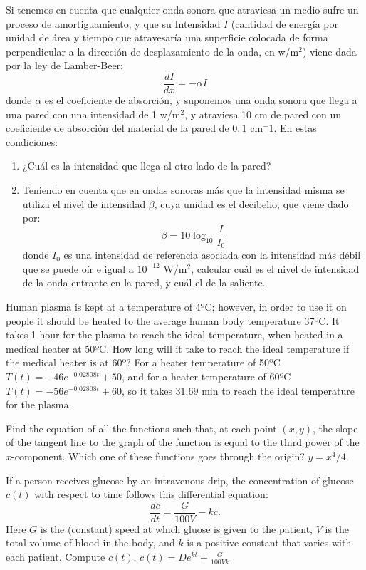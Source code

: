 {Si tenemos en cuenta que cualquier onda sonora que atraviesa un medio sufre un proceso de amortiguamiento, y que su
Intensidad $I$ (cantidad de energía por unidad de área y tiempo que atravesaría una superficie colocada de forma
perpendicular a la dirección de desplazamiento de la onda, en w/m$^2$) viene dada por la ley de Lamber-Beer:
\[
\frac{{dI}}{{dx}} =  - \alpha I
\]
donde $\alpha$ es el coeficiente de absorción, y suponemos una onda sonora que llega a una pared con una intensidad de 1 w/m$^2$, y atraviesa 10 cm de pared con un coeficiente de absorción del material de la pared de $0,1$ cm$^-1$. En estas condiciones:
\begin{enumerate}
\item ¿Cuál es la intensidad que llega al otro lado de la pared?
\item Teniendo en cuenta que en ondas sonoras más que la intensidad misma se utiliza el nivel de intensidad $\beta$, cuya unidad es el decibelio, que viene dado por:
\[
\beta  = 10\log _{10} \frac{I}{{I_0 }}
\]
donde $I_0$ es una intensidad de referencia asociada con la intensidad más débil que se puede oír e igual a $10^{-12}$ W/m$^2$, calcular cuál es el nivel de intensidad de la onda entrante en la pared, y cuál el de la saliente.
\end{enumerate}
}
{
}
{}


{Human plasma is kept at a temperature of 4ºC; however, in order to use it on people it should be heated to the average human body temperature 37ºC.
It takes 1 hour for the plasma to reach the ideal temperature, when heated in a medical heater at 50ºC.
How long will it take to reach the ideal temperature if the medical heater is at 60º?
}
{For a heater temperature of 50ºC $T(t)=-46e^{-0.02808t}+50$, and for a heater temperature of 60ºC $T(t)=-56e^{-0.02808t}+60$, so it takes $31.69$ min to reach the ideal temperature for the plasma.}
{}


{Find the equation of all the functions such that, at each point $(x,y)$,
the slope of the tangent line to the graph of the function is equal to the third power of the
$x$-component.
Which one of these functions goes through the origin?
}
{$y=x^4/4$.
}
{}


{If a person receives glucose by an intravenous drip, the concentration of glucose $c(t)$ with respect to time follows this differential equation:
\[
\frac{dc}{dt}=\frac{G}{100V}-kc.
\]
Here $G$ is the (constant) speed at which gluose is given to the patient, $V$ is the total volume of blood in the body, and $k$ is a positive constant that varies with each patient.
Compute $c(t)$.
}
{$c(t)=De^{kt}+\frac{G}{100Vk}$
}
{}


